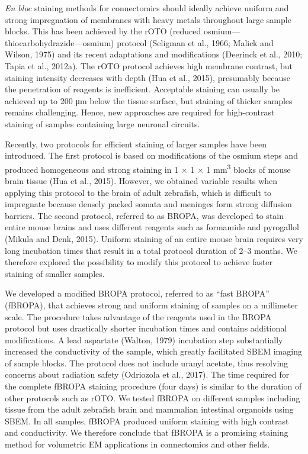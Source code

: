 \documentclass{article}
\begin{document}
\emph{En bloc} staining methods for connectomics should ideally achieve uniform and strong impregnation of membranes with heavy metals throughout large sample blocks. This has been achieved by the rOTO (reduced osmium—thiocarbohydrazide—osmium) protocol (Seligman et al., 1966; Malick and Wilson, 1975) and its recent adaptations and modifications (Deerinck et al., 2010; Tapia et al., 2012a). The rOTO protocol achieves high membrane contrast, but staining intensity decreases with depth (Hua et al., 2015), presumably because the penetration of reagents is inefficient. Acceptable staining can usually be achieved up to 200 μm below the tissue surface, but staining of thicker samples remains challenging. Hence, new approaches are required for high-contrast staining of samples containing large neuronal circuits.

Recently, two protocols for efficient staining of larger samples have been introduced. The first protocol is based on modifications of the osmium steps and produced homogeneous and strong staining in 1 × 1 × 1 mm\textsuperscript{3} blocks of mouse brain tissue (Hua et al., 2015). However, we obtained variable results when applying this protocol to the brain of adult zebrafish, which is difficult to impregnate because densely packed somata and meninges form strong diffusion barriers. The second protocol, referred to as BROPA, was developed to stain entire mouse brains and uses different reagents such as formamide and pyrogallol (Mikula and Denk, 2015). Uniform staining of an entire mouse brain requires very long incubation times that result in a total protocol duration of 2–3 months. We therefore explored the possibility to modify this protocol to achieve faster staining of smaller samples.

We developed a modified BROPA protocol, referred to as “fast BROPA” (fBROPA), that achieves strong and uniform staining of samples on a millimeter scale. The procedure takes advantage of the reagents used in the BROPA protocol but uses drastically shorter incubation times and contains additional modifications. A lead aspartate (Walton, 1979) incubation step substantially increased the conductivity of the sample, which greatly facilitated SBEM imaging of sample blocks. The protocol does not include uranyl acetate, thus resolving concerns about radiation safety (Odriozola et al., 2017). The time required for the complete fBROPA staining procedure (four days) is similar to the duration of other protocols such as rOTO. We tested fBROPA on different samples including tissue from the adult zebrafish brain and mammalian intestinal organoids using SBEM. In all samples, fBROPA produced uniform staining with high contrast and conductivity. We therefore conclude that fBROPA is a promising staining method for volumetric EM applications in connectomics and other fields.
\end{document}
